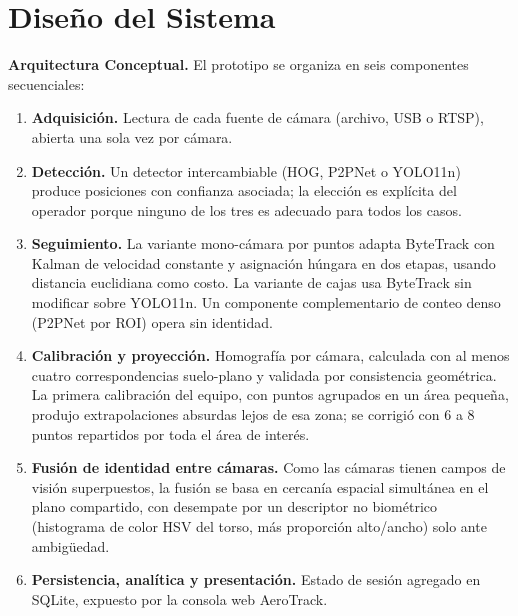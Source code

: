 \section{Diseño del Sistema}
\label{sec:diseno-sistema}

\textbf{Arquitectura Conceptual.} El prototipo se organiza en seis componentes
secuenciales:


\begin{enumerate}
  \item \textbf{Adquisición.} Lectura de cada fuente de cámara (archivo, USB o RTSP),
  abierta una sola vez por cámara.

  \item \textbf{Detección.} Un detector intercambiable (HOG, P2PNet o YOLO11n) produce
  posiciones con confianza asociada; la elección es explícita del operador porque
  ninguno de los tres es adecuado para todos los casos.

  \item \textbf{Seguimiento.} La variante mono-cámara por puntos adapta ByteTrack con
  Kalman de velocidad constante y asignación húngara en dos etapas, usando distancia
  euclidiana como costo. La variante de cajas usa ByteTrack sin modificar sobre
  YOLO11n. Un componente complementario de conteo denso (P2PNet por ROI) opera sin
  identidad.

  \item \textbf{Calibración y proyección.} Homografía por cámara, calculada con al menos
  cuatro correspondencias suelo-plano y validada por consistencia geométrica. La
  primera calibración del equipo, con puntos agrupados en un área pequeña, produjo
  extrapolaciones absurdas lejos de esa zona; se corrigió con 6 a 8 puntos repartidos
  por toda el área de interés.

  \item \textbf{Fusión de identidad entre cámaras.} Como las cámaras tienen campos de
  visión superpuestos, la fusión se basa en cercanía espacial simultánea en el plano
  compartido, con desempate por un descriptor no biométrico (histograma de color HSV
  del torso, más proporción alto/ancho) solo ante ambigüedad.


  \item \textbf{Persistencia, analítica y presentación.} Estado de sesión agregado en
  SQLite, expuesto por la consola web AeroTrack.
\end{enumerate}
